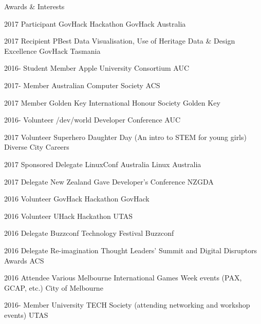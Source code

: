 \begin{tmrsection}{Awards \& Interests}


\tmrcolumnentry
    {2017}
  	{Participant}
    {GovHack Hackathon}
    {GovHack Australia}

\tmrcolumnentry
  	{2017}
  	{Recipient}
  	{PBest Data Visualisation, Use of Heritage Data \& Design Excellence}
  	{GovHack Tasmania}


\tmrcolumnentry
    {2016-}
    {Student Member}
    {Apple University Consortium}
    {AUC}

\tmrcolumnentry
    {2017-}
    {Member}
    {Australian Computer Society}
    {ACS}
    
\tmrcolumnentry
  	{2017}
  	{Member}
  	{Golden Key International Honour Society}
  	{Golden Key}


\tmrcolumnentry
    {2016-}
    {Volunteer}
    {/dev/world Developer Conference}
    {AUC}

\tmrcolumnentry
    {2017}
    {Volunteer}
    {Superhero Daughter Day (An intro to STEM for young girls)}
    {Diverse City Careers}

\tmrcolumnentry
    {2017}
    {Sponsored Delegate}
    {LinuxConf Australia}
    {Linux Australia}

\tmrcolumnentry
  	{2017}
  	{Delegate}
  	{New Zealand Gave Developer's Conference}
  	{NZGDA}

\tmrcolumnentry
    {2016}
    {Volunteer}
    {GovHack Hackathon}
    {GovHack}

\tmrcolumnentry
	{2016}
	{Volunteer}
	{UHack Hackathon}
	{UTAS}

\tmrcolumnentry
    {2016}
    {Delegate}
    {Buzzconf Technology Festival}
    {Buzzconf}

\tmrcolumnentry
    {2016}
    {Delegate}
    {Re-imagination Thought Leaders' Summit and Digital Disruptors Awards}
    {ACS}
    
\tmrcolumnentry
    {2016}
    {Attendee}
    {Various Melbourne International Games Week events (PAX, GCAP, etc.)}
    {City of Melbourne}
    

\tmrcolumnentry
    {2016-}
    {Member}
    {University TECH Society (attending networking and workshop events)}
    {UTAS}
    

\end{tmrsection}
